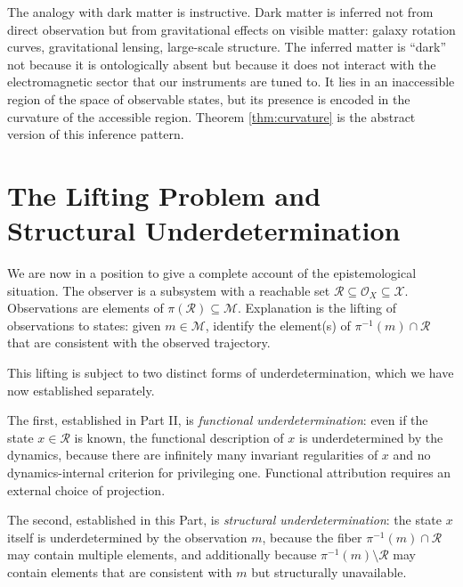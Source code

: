 \documentclass[12pt, a4paper, oneside]{article}
\theoremstyle{plain}
\theoremstyle{definition}
\theoremstyle{remark}
\newcommand{\X}{\mathcal{X}}
\newcommand{\M}{\mathcal{M}}
\newcommand{\Obs}{\mathcal{O}}
\newcommand{\R}{\mathcal{R}}
\newcommand{\proj}{\pi}
\begin{document}
The analogy with dark matter is instructive. Dark matter is inferred not from direct observation but from gravitational effects on visible matter: galaxy rotation curves, gravitational lensing, large-scale structure. The inferred matter is ``dark'' not because it is ontologically absent but because it does not interact with the electromagnetic sector that our instruments are tuned to. It lies in an inaccessible region of the space of observable states, but its presence is encoded in the curvature of the accessible region. Theorem \ref{thm:curvature} is the abstract version of this inference pattern.

\section{The Lifting Problem and Structural Underdetermination}

We are now in a position to give a complete account of the epistemological situation. The observer is a subsystem with a reachable set $\R \subseteq \Obs_X \subseteq \X$. Observations are elements of $\proj(\R) \subseteq \M$. Explanation is the lifting of observations to states: given $m \in \M$, identify the element(s) of $\proj^{-1}(m) \cap \R$ that are consistent with the observed trajectory.

This lifting is subject to two distinct forms of underdetermination, which we have now established separately.

The first, established in Part II, is \emph{functional underdetermination}: even if the state $x \in \R$ is known, the functional description of $x$ is underdetermined by the dynamics, because there are infinitely many invariant regularities of $x$ and no dynamics-internal criterion for privileging one. Functional attribution requires an external choice of projection.

The second, established in this Part, is \emph{structural underdetermination}: the state $x$ itself is underdetermined by the observation $m$, because the fiber $\proj^{-1}(m) \cap \R$ may contain multiple elements, and additionally because $\proj^{-1}(m) \setminus \R$ may contain elements that are consistent with $m$ but structurally unavailable.
\end{document}
